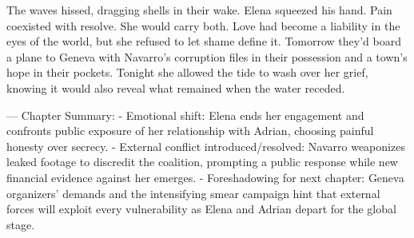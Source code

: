 The waves hissed, dragging shells in their wake. Elena squeezed his hand. Pain coexisted with resolve. She would carry both. Love had become a liability in the eyes of the world, but she refused to let shame define it. Tomorrow they'd board a plane to Geneva with Navarro's corruption files in their possession and a town's hope in their pockets. Tonight she allowed the tide to wash over her grief, knowing it would also reveal what remained when the water receded.

\bigskip

---
Chapter Summary:
- Emotional shift: Elena ends her engagement and confronts public exposure of her relationship with Adrian, choosing painful honesty over secrecy.
- External conflict introduced/resolved: Navarro weaponizes leaked footage to discredit the coalition, prompting a public response while new financial evidence against her emerges.
- Foreshadowing for next chapter: Geneva organizers' demands and the intensifying smear campaign hint that external forces will exploit every vulnerability as Elena and Adrian depart for the global stage.
